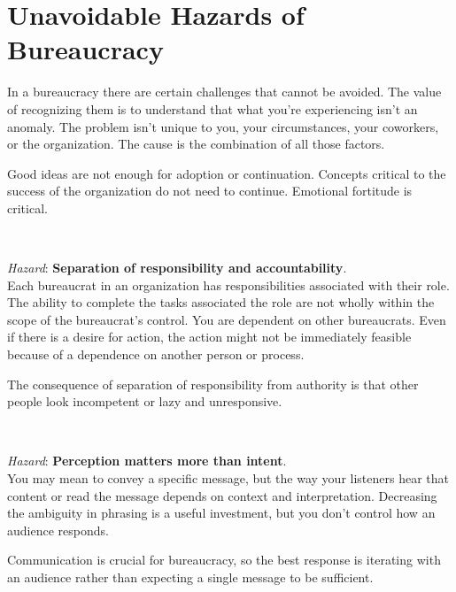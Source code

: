 \section{Unavoidable Hazards of Bureaucracy\label{sec:unavoidable-hazards}}

In a bureaucracy there are certain challenges that cannot be avoided. The value of recognizing them is to understand that what you're experiencing isn't an anomaly. The problem isn't unique to you, your circumstances, your coworkers, or the organization. The cause is the combination of all those factors.

Good ideas are not enough for adoption or continuation.
Concepts critical to the success of the organization do not need to continue. Emotional fortitude is critical.


\ \\
\begin{samepage}
\textit{Hazard}: \textbf{Separation of responsibility and accountability}. \\
Each bureaucrat in an organization has responsibilities associated with their role. The ability to complete the tasks associated the role are not wholly within the scope of the bureaucrat's control. You are dependent on other bureaucrats. Even if there is a desire for action, the action might not be immediately feasible because of a dependence on another person or process. 

The consequence of separation of responsibility from authority is that other people look incompetent or lazy and unresponsive.
\end{samepage}

\ \\
\begin{samepage}
\textit{Hazard}: \textbf{Perception matters more than intent}. \\
You may mean to convey a specific message, but the way your listeners hear that content or read the message depends on context and interpretation. 
Decreasing the ambiguity in phrasing is a useful investment, but you don't control how an audience responds. 

Communication is crucial for bureaucracy, so the best response is iterating with an audience rather than expecting a single message to be sufficient. 
\end{samepage}

